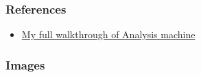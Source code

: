 \documentclass[a4paper]{article}
\def\tightlist{}
\begin{document}
    
          \subsubsection{References}

      \begin{itemize}
\tightlist
\item
  \href{https://github.com/alstephh/This_Is_Just_A_Hobby/tree/e42a866bb781fb896d6b9c03a33185e192a317b8/MACHINES/HTB/Analysis}{My full walkthrough of Analysis machine}
\end{itemize}

    
          \subsubsection{Images}
      
\end{document}
